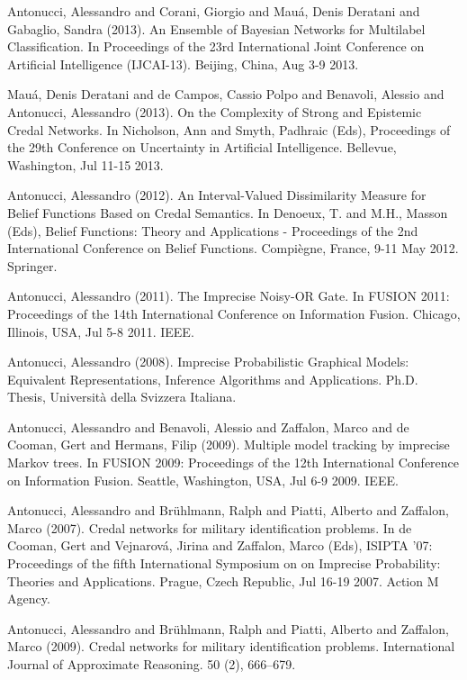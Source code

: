 \begin{cventries}
\begin{cvitems}
\item Antonucci, Alessandro and Corani, Giorgio and Mauá, Denis Deratani and Gabaglio, Sandra (2013).   An Ensemble of Bayesian Networks for Multilabel Classification.   In Proceedings of the 23rd International Joint Conference on Artificial Intelligence (IJCAI-13).   Beijing, China,   Aug 3-9 2013.
\item Mauá, Denis Deratani and de Campos, Cassio Polpo and Benavoli, Alessio and Antonucci, Alessandro (2013).   On the Complexity of Strong and Epistemic Credal Networks.   In Nicholson, Ann and Smyth, Padhraic (Eds), Proceedings of the 29th Conference on Uncertainty in Artificial Intelligence.   Bellevue, Washington,   Jul 11-15 2013.
\item Antonucci, Alessandro (2012).   An Interval-Valued Dissimilarity Measure for Belief Functions Based on Credal Semantics.   In Denoeux, T. and M.H., Masson (Eds), Belief Functions: Theory and Applications - Proceedings of the 2nd International Conference on Belief Functions.   Compiègne, France,   9-11 May 2012.   Springer.
\item Antonucci, Alessandro (2011).   The Imprecise Noisy-OR Gate.   In FUSION 2011: Proceedings of the 14th International Conference on Information Fusion.   Chicago, Illinois, USA,   Jul 5-8 2011.   IEEE.
\item Antonucci, Alessandro (2008).   Imprecise Probabilistic Graphical Models: Equivalent Representations, Inference Algorithms and Applications.   Ph.D. Thesis, Università della Svizzera Italiana.
\item Antonucci, Alessandro and Benavoli, Alessio and Zaffalon, Marco and de Cooman, Gert and Hermans, Filip (2009).   Multiple model tracking by imprecise Markov trees.   In FUSION 2009: Proceedings of the 12th International Conference on Information Fusion.   Seattle, Washington, USA,   Jul 6-9 2009.   IEEE.
\item Antonucci, Alessandro and Brühlmann, Ralph and Piatti, Alberto and Zaffalon, Marco (2007).   Credal networks for military identification problems.   In de Cooman, Gert and Vejnarová, Jirina and Zaffalon, Marco (Eds), ISIPTA ’07: Proceedings of the fifth International Symposium on on Imprecise Probability: Theories and Applications.   Prague, Czech Republic,   Jul 16-19 2007.   Action M Agency.
\item Antonucci, Alessandro and Brühlmann, Ralph and Piatti, Alberto and Zaffalon, Marco (2009).   Credal networks for military identification problems.   International Journal of Approximate Reasoning. 50 (2), 666–679.

\end{cvitems}
\end{cventries}
